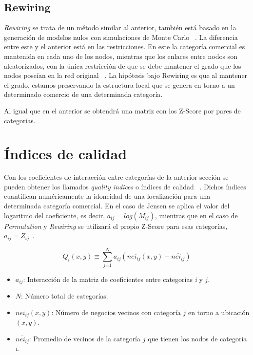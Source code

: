 \subsection{Rewiring}

\textit{Rewiring} se trata de un método similar al anterior, también está basado en la generación de modelos nulos con simulaciones de Monte Carlo ~\cite{Montecarlo}. La diferencia entre este y el anterior está en las restricciones. En este la categoría comercial es mantenida en cada uno de los nodos, mientras que los enlaces entre nodos son aleatorizados, con la única restricción de que se debe mantener el grado que los nodos poseían en la red original ~\cite{Ahedo2021,RSVAJSSHJG}. La hipótesis bajo Rewiring es que al mantener el grado, estamos preservando la estructura local que se genera en torno a un determinado comercio de una determinada categoría.

Al igual que en el anterior se obtendrá una matriz con los Z-Score por pares de categorías.



\section{Índices de calidad}

Con los coeficientes de interacción entre categorías de la anterior sección se pueden obtener los llamados \textit{quality indices} o índices de calidad ~\cite{Ahedo2021,Jensen2006,RSVAJSSHJG}. Dichos índices cuantifican numéricamente la idoneidad de una localización para una determinada categoría comercial. En el caso de Jensen se aplica el valor del logaritmo del coeficiente, es decir, $a_{ij} = log(M_{ij})$, mientras que en el caso de \textit{Permutation} y \textit{Rewiring} se utilizará el propio Z-Score para esas categorías, $a_{ij} = Z_{ij}$~\cite{Ahedo2021}. 

\begin{equation*}
	Q_i(x,y) \equiv \sum_\textit{j=1}^N a_{ij} (nei_{ij}(x,y) - \overline{nei_{ij}})
\end{equation*}



\begin{itemize}
	\item $a_{ij}$: Interacción de la matriz de coeficientes entre categorías \textit{i} y \textit{j}.
	\item $N$: Número total de categorías.
	\item $nei_{ij}(x,y)$: Número de negocios vecinos con categoría $j$ en torno a ubicación $(x,y)$.
	\item $\overline{nei_{ij}}$: Promedio de vecinos de la categoría $j$ que tienen los nodos de categoría $i$.
\end{itemize}

